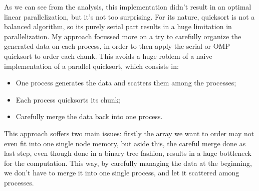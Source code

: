 \documentclass{article}
\begin{document}
	As we can see from the analysis, this implementation didn't result in an optimal linear parallelization, but it's not too surprising.
	For its nature, quicksort is not a balanced algorithm, so its purely serial part results in a huge limitation in parallelization.
	My approach focussed more on a try to carefully organize the generated data on each process, in order to then apply the serial or OMP quicksort to order each chunk. This avoids a huge roblem of a naive implementation of a parallel quicksort, which consists in:
	\begin{itemize}
		\item One process generates the data and scatters them among the processes;
		\item Each process quicksorts its chunk;
		\item Carefully merge the data back into one process.
	\end{itemize}
	This approach soffers two main issues: firstly the array we want to order may not even fit into one single node memory, but aside this, the careful merge done as last step, even though done in a binary tree fashion, results in a huge bottleneck for the computation. This way, by carefully managing the data at the beginning, we don't have to merge it into one single process, and let it scattered among processes.
	
\end{document}
